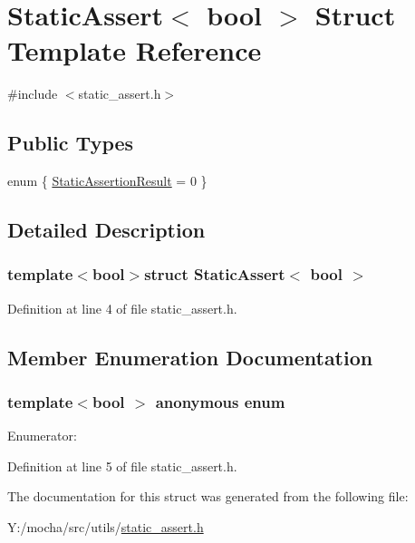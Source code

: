 \hypertarget{struct_static_assert}{
\section{StaticAssert$<$ bool $>$ Struct Template Reference}
\label{struct_static_assert}
}


{\ttfamily \#include $<$static\_\-assert.h$>$}

\subsection*{Public Types}
\begin{DoxyCompactItemize}
\item 
enum \{ \hyperlink{struct_static_assert_a0cf88b76a365c51b8abd47ba113d68bfa5b12e93f2652446a58bf334372210182}{StaticAssertionResult} =  0
 \}
\end{DoxyCompactItemize}


\subsection{Detailed Description}
\subsubsection*{template$<$bool$>$struct StaticAssert$<$ bool $>$}



Definition at line 4 of file static\_\-assert.h.



\subsection{Member Enumeration Documentation}
\hypertarget{struct_static_assert_a0cf88b76a365c51b8abd47ba113d68bf}{
\subsubsection[{"@25}]{\setlength{\rightskip}{0pt plus 5cm}template$<$bool $>$ anonymous enum}}
\label{struct_static_assert_a0cf88b76a365c51b8abd47ba113d68bf}
\begin{Desc}
\item[Enumerator: ]\par
\begin{description}
\item[{\em 
\hypertarget{struct_static_assert_a0cf88b76a365c51b8abd47ba113d68bfa5b12e93f2652446a58bf334372210182}{
StaticAssertionResult}
\label{struct_static_assert_a0cf88b76a365c51b8abd47ba113d68bfa5b12e93f2652446a58bf334372210182}
}]\end{description}
\end{Desc}



Definition at line 5 of file static\_\-assert.h.



The documentation for this struct was generated from the following file:\begin{DoxyCompactItemize}
\item 
Y:/mocha/src/utils/\hyperlink{static__assert_8h}{static\_\-assert.h}\end{DoxyCompactItemize}
